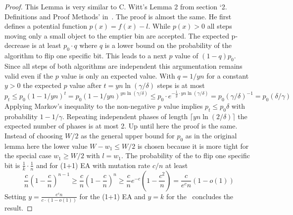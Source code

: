 \begin{proof}
    This Lemma is very similar to C. Witt's  Lemma 2 from section `2. Definitions and Proof Methods' in~\cite{witt2005worst}.
    The proof is almost the same.
    He first defines a potential function $p(x)=f(x)-l$.
    While $p(x)>0$ all steps moving only a small object to the emptier bin are accepted.
    The expected p-decrease is at least $p_0\cdot q$ where $q$ is a lower bound on the probability of the algorithm to flip one specific bit.
    This leads to a next $p$ value of $(1-q)p_0$.
    Since all steps of both algorithms are independent this argumentation remains valid even if the $p$ value is only an expected value.
    With $q=1/yn$ for a constant $y>0$ the expected $p$ value after $t=yn\ln(\gamma/\delta)$ steps is at most
    \[p_t\le p_0{(1-1/yn)}^t=p_0{(1-1/yn)}^{yn\ln(\gamma/\delta)}\le p_0\cdot e^{-\frac{1}{y}\cdot yn\ln(\gamma/\delta)}=p_0{(\gamma/\delta)}^{-1} = p_0(\delta/\gamma)\]
    Applying Markov's inequality to the non-negative $p$ value implies $p_t\le p_0\delta$ with probability $1-1/\gamma$.
    Repeating independent phases of length $\lceil yn\ln(2/\delta)\rceil$ the expected number of phases is at most 2.
    Up until here the proof is the same.\newline
    Instead of choosing $W/2$ as the general upper bound for $p_0$ as in the original lemma here the lower value $W-w_1\le W/2$ is chosen because it is more tight for the special case $w_1\ge W/2$ with $l=w_1$.
    The probability of the \RLSR[k] to flip one specific bit is \(\frac{1}{k}\cdot\frac{1}{n}\) and for (1+1) EA with mutation rate $c/n$ at least
    \[
        \frac{c}{n}{(1-\frac{c}{n})}^{n-1}
        \ge \frac{c}{n}{(1-\frac{c}{n})}^{n}
        \ge \frac{c}{n}e^{-c}(1-\frac{c^2}{n})
        = \frac{c}{e^c n}(1-o(1))
    \]
    Setting $y=\frac{e^c n}{c\cdot(1-o(1))}$ for the (1+1) EA and $y=k$ for the \RLSR~concludes the result.
\end{proof}

